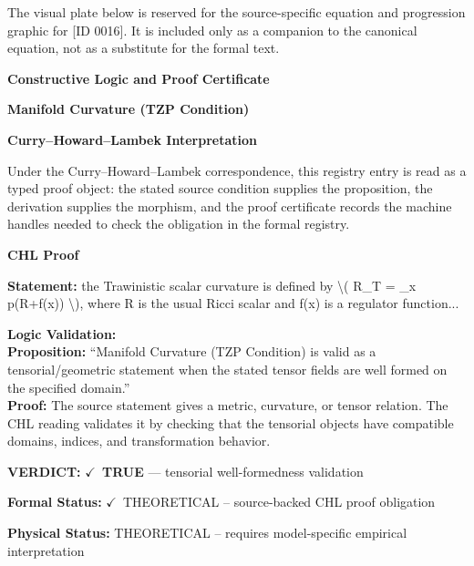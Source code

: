 \begingroup\footnotesize\sloppy
The visual plate below is reserved for the source-specific equation and progression graphic for [ID 0016]. It is included only as a companion to the canonical equation, not as a substitute for the formal text.
\par\endgroup
\ifTZPDarkEdition
{}
\fi

\clearpage
\begingroup\tzpsupportsetup
\noindent\textbf{\fontsize{10.8pt}{12.8pt}\selectfont [ID 0016] Constructive Logic and Proof Certificate}\par
\noindent\textbf{\fontsize{10pt}{12pt}\selectfont Manifold Curvature (TZP Condition)}\par
\vspace{0.45em}
\begingroup
\footnotesize
\setlength{\parskip}{0.22em}
\setlength{\parindent}{0pt}
\noindent\textbf{Curry--Howard--Lambek Interpretation}\par
Under the Curry--Howard--Lambek correspondence, this registry entry is read as a typed proof
object: the stated source condition supplies the proposition, the derivation supplies the
morphism, and the proof certificate records the machine handles needed to check the obligation
in the formal registry.

\vspace{0.45em}
\noindent\textbf{CHL Proof}\par
\textbf{Statement:} the Trawinistic scalar curvature  is defined by \textbackslash{}( R\_T = \_x p(R+f(x)) \textbackslash{}), where R is
the usual Ricci scalar and f(x) is a regulator function...

\textbf{Logic Validation:}\\
\textbf{Proposition:} ``Manifold Curvature (TZP Condition) is valid as a tensorial/geometric statement when the
stated tensor fields are well formed on the specified domain.''\\
\textbf{Proof:} The source statement gives a metric, curvature, or tensor relation. The CHL reading
validates it by checking that the tensorial objects have compatible domains, indices,
and transformation behavior.

\textbf{VERDICT:} \ensuremath{\checkmark}\ \textbf{TRUE} --- tensorial well-formedness validation

\textbf{Formal Status:} \ensuremath{\checkmark}\ THEORETICAL -- source-backed CHL proof obligation

\textbf{Physical Status:} THEORETICAL -- requires model-specific empirical interpretation
\par\vspace{0.45em}
\par
\ifTZPDarkEdition
{}
\fi
\endgroup
\endgroup
